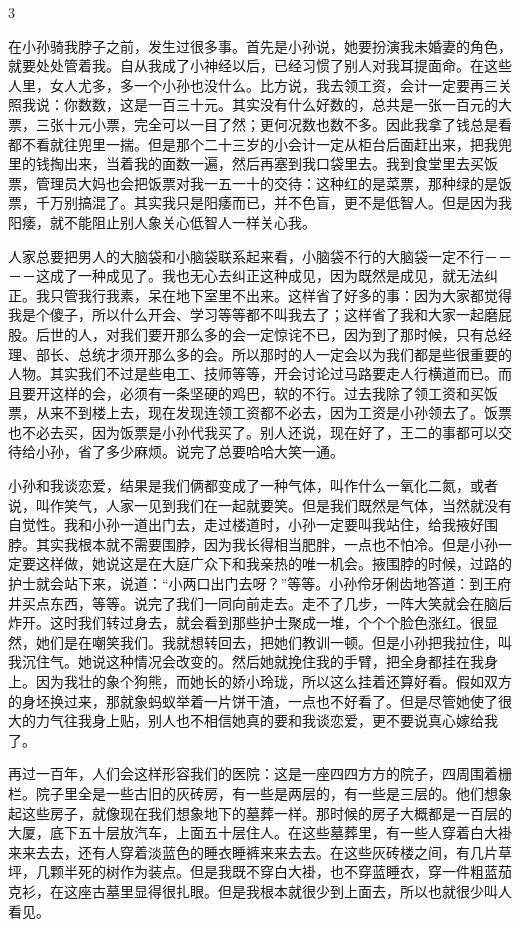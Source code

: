 3 

在小孙骑我脖子之前，发生过很多事。首先是小孙说，她要扮演我未婚妻的角色，就要处处管着我。自从我成了小神经以后，已经习惯了别人对我耳提面命。在这些人里，女人尤多，多一个小孙也没什么。比方说，我去领工资，会计一定要再三关照我说：你数数，这是一百三十元。其实没有什么好数的，总共是一张一百元的大票，三张十元小票，完全可以一目了然；更何况数也数不多。因此我拿了钱总是看都不看就往兜里一揣。但是那个二十三岁的小会计一定从柜台后面赶出来，把我兜里的钱掏出来，当着我的面数一遍，然后再塞到我口袋里去。我到食堂里去买饭票，管理员大妈也会把饭票对我一五一十的交待：这种红的是菜票，那种绿的是饭票，千万别搞混了。其实我只是阳痿而已，并不色盲，更不是低智人。但是因为我阳痿，就不能阻止别人象关心低智人一样关心我。 

人家总要把男人的大脑袋和小脑袋联系起来看，小脑袋不行的大脑袋一定不行－－－－这成了一种成见了。我也无心去纠正这种成见，因为既然是成见，就无法纠正。我只管我行我素，呆在地下室里不出来。这样省了好多的事：因为大家都觉得我是个傻子，所以什么开会、学习等等都不叫我去了；这样省了我和大家一起磨屁股。后世的人，对我们要开那么多的会一定惊诧不已，因为到了那时候，只有总经理、部长、总统才须开那么多的会。所以那时的人一定会以为我们都是些很重要的人物。其实我们不过是些电工、技师等等，开会讨论过马路要走人行横道而已。而且要开这样的会，必须有一条坚硬的鸡巴，软的不行。过去我除了领工资和买饭票，从来不到楼上去，现在发现连领工资都不必去，因为工资是小孙领去了。饭票也不必去买，因为饭票是小孙代我买了。别人还说，现在好了，王二的事都可以交待给小孙，省了多少麻烦。说完了总要哈哈大笑一通。 

小孙和我谈恋爱，结果是我们俩都变成了一种气体，叫作什么一氧化二氮，或者说，叫作笑气，人家一见到我们在一起就要笑。但是我们既然是气体，当然就没有自觉性。我和小孙一道出门去，走过楼道时，小孙一定要叫我站住，给我掖好围脖。其实我根本就不需要围脖，因为我长得相当肥胖，一点也不怕冷。但是小孙一定要这样做，她说这是在大庭广众下和我亲热的唯一机会。掖围脖的时候，过路的护士就会站下来，说道：“小两口出门去呀？”等等。小孙伶牙俐齿地答道：到王府井买点东西，等等。说完了我们一同向前走去。走不了几步，一阵大笑就会在脑后炸开。这时我们转过身去，就会看到那些护士聚成一堆，个个个脸色涨红。很显然，她们是在嘲笑我们。我就想转回去，把她们教训一顿。但是小孙把我拉住，叫我沉住气。她说这种情况会改变的。然后她就挽住我的手臂，把全身都挂在我身上。因为我壮的象个狗熊，而她长的娇小玲珑，所以这么挂着还算好看。假如双方的身坯换过来，那就象蚂蚁举着一片饼干渣，一点也不好看了。但是尽管她使了很大的力气往我身上贴，别人也不相信她真的要和我谈恋爱，更不要说真心嫁给我了。 

再过一百年，人们会这样形容我们的医院：这是一座四四方方的院子，四周围着栅栏。院子里全是一些古旧的灰砖房，有一些是两层的，有一些是三层的。他们想象起这些房子，就像现在我们想象地下的墓葬一样。那时候的房子大概都是一百层的大厦，底下五十层放汽车，上面五十层住人。在这些墓葬里，有一些人穿着白大褂来来去去，还有人穿着淡蓝色的睡衣睡裤来来去去。在这些灰砖楼之间，有几片草坪，几颗半死的树作为装点。但是我既不穿白大褂，也不穿蓝睡衣，穿一件粗蓝茄克衫，在这座古墓里显得很扎眼。但是我根本就很少到上面去，所以也就很少叫人看见。 

